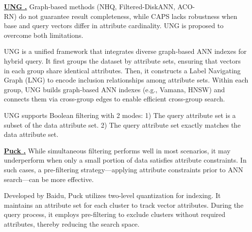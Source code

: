 \documentclass[sigconf, nonacm]{acmart}
\begin{document}
\vspace{1em}
\noindent\textbf{\underline{UNG \cite{UNG}.}} Graph-based methods (NHQ, Filtered-DiskANN, ACO-\\RN) do not guarantee result completeness, while CAPS lacks robustness when base and query vectors differ in attribute cardinality. UNG is proposed to overcome both limitations.

UNG is a unified framework that integrates diverse graph-based ANN indexes for hybrid query. It first groups the dataset by attribute sets, ensuring that vectors in each group share identical attributes. Then, it constructs a Label Navigating Graph (LNG) to encode inclusion relationships among attribute sets. Within each group, UNG builds graph-based ANN indexes (e.g., Vamana, HNSW) and connects them via cross-group edges to enable efficient cross-group search.

UNG supports Boolean filtering with 2 modes:  
1) The query attribute set is a subset of the data attribute set.  
2) The query attribute set exactly matches the data attribute set.



\vspace{1em}
\noindent\textbf{\underline{Puck \cite{puck}.}}  
While simultaneous filtering performs well in most scenarios, it may underperform when only a small portion of data satisfies attribute constraints. In such cases, a pre-filtering strategy—applying attribute constraints prior to ANN search—can be more effective.

Developed by Baidu, Puck utilizes two-level quantization for indexing. It maintains an attribute set for each cluster to track vector attributes. During the query process, it employs pre-filtering to exclude clusters without required attributes, thereby reducing the search space.
\end{document}
